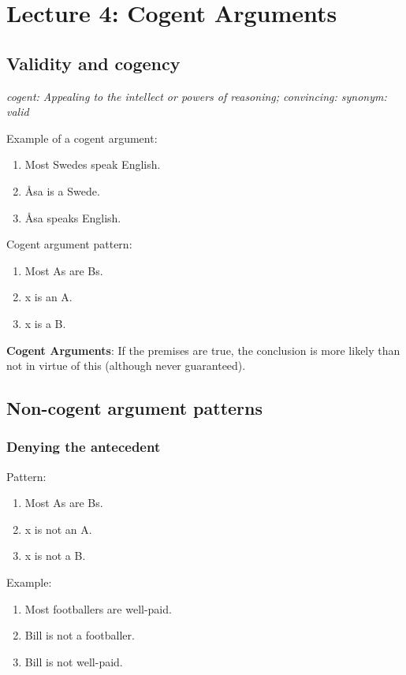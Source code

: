 \section{Lecture 4: Cogent Arguments}

\subsection{Validity and cogency}

\textit{cogent: Appealing to the intellect or powers of reasoning;
convincing: synonym: valid}

Example of a cogent argument:

\begin{enumerate}
    \item Most Swedes speak English.
    \item Åsa is a Swede.
    \item Åsa speaks English.
\end{enumerate}

Cogent argument pattern:

\begin{enumerate}
    \item Most As are Bs.
    \item x is an A.
    \item x is a B.
\end{enumerate}

\textbf{Cogent Arguments}: If the premises are true, the conclusion
is more likely than not in virtue of this (although never guaranteed).

\subsection{Non-cogent argument patterns}

\subsubsection{Denying the antecedent}

Pattern: 
\begin{enumerate}
    \item Most As are Bs.
    \item x is not an A.
    \item x is not a B.
\end{enumerate}

Example:
\begin{enumerate}
    \item Most footballers are well-paid.
    \item Bill is not a footballer.
    \item Bill is not well-paid.
\end{enumerate}

